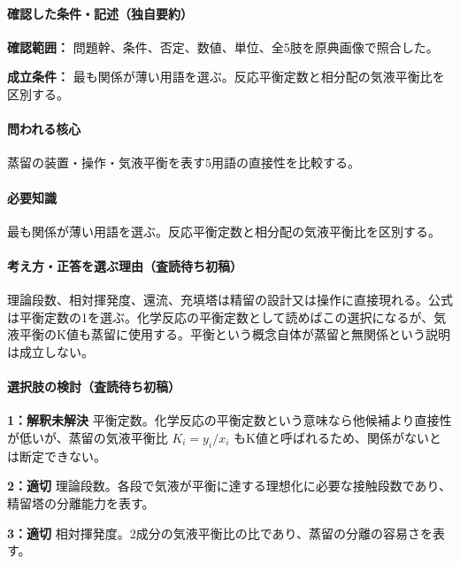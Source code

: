 \paragraph{確認した条件・記述（独自要約）}\mbox{}\par

\noindent\textbf{確認範囲：} 問題幹、条件、否定、数値、単位、全5肢を原典画像で照合した。\par

\noindent\textbf{成立条件：} 最も関係が薄い用語を選ぶ。反応平衡定数と相分配の気液平衡比を区別する。\par

\paragraph{問われる核心} 蒸留の装置・操作・気液平衡を表す5用語の直接性を比較する。

\paragraph{必要知識} 最も関係が薄い用語を選ぶ。反応平衡定数と相分配の気液平衡比を区別する。

\paragraph{考え方・正答を選ぶ理由（査読待ち初稿）} 理論段数、相対揮発度、還流、充填塔は精留の設計又は操作に直接現れる。公式は平衡定数の1を選ぶ。化学反応の平衡定数として読めばこの選択になるが、気液平衡のK値も蒸留に使用する。平衡という概念自体が蒸留と無関係という説明は成立しない。

\paragraph{選択肢の検討（査読待ち初稿）}\mbox{}\par

\noindent\textbf{1：解釈未解決} 平衡定数。化学反応の平衡定数という意味なら他候補より直接性が低いが、蒸留の気液平衡比 \(K_i=y_i/x_i\) もK値と呼ばれるため、関係がないとは断定できない。\par

\noindent\textbf{2：適切} 理論段数。各段で気液が平衡に達する理想化に必要な接触段数であり、精留塔の分離能力を表す。\par

\noindent\textbf{3：適切} 相対揮発度。2成分の気液平衡比の比であり、蒸留の分離の容易さを表す。\par

